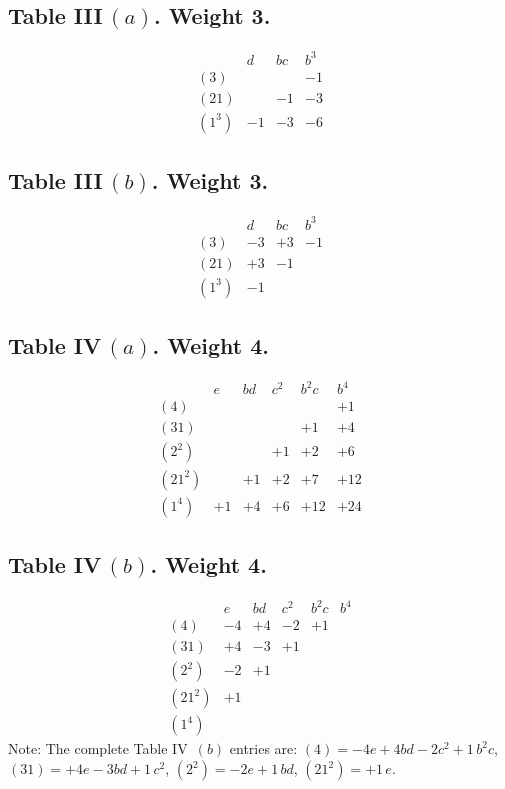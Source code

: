 \documentclass[11pt,a4paper]{book}
\begin{document}
\begin{center}
\subsection*{Table III\,$(a)$. Weight 3.}
\[
\begin{array}{c|ccc}
& d & bc & b^3 \\ \hline
(3) & & & -1 \\
(21) & & -1 & -3 \\
(1^3) & -1 & -3 & -6
\end{array}
\]

\subsection*{Table III\,$(b)$. Weight 3.}
\[
\begin{array}{c|ccc}
& d & bc & b^3 \\ \hline
(3) & -3 & +3 & -1 \\
(21) & +3 & -1 & \\
(1^3) & -1 & &
\end{array}
\]

\newpage
\subsection*{Table IV\,$(a)$. Weight 4.}
\[
\begin{array}{c|ccccc}
& e & bd & c^2 & b^2 c & b^4 \\ \hline
(4) & & & & & +1 \\
(31) & & & & +1 & +4 \\
(2^2) & & & +1 & +2 & +6 \\
(21^2) & & +1 & +2 & +7 & +12 \\
(1^4) & +1 & +4 & +6 & +12 & +24
\end{array}
\]

\subsection*{Table IV\,$(b)$. Weight 4.}
\[
\begin{array}{c|ccccc}
& e & bd & c^2 & b^2 c & b^4 \\ \hline
(4) & -4 & +4 & -2 & +1 \\
(31) & +4 & -3 & +1 \\
(2^2) & -2 & +1 \\
(21^2) & +1 \\
(1^4)
\end{array}
\]
Note: The complete Table IV~$(b)$ entries are:
$(4) = -4e + 4bd - 2c^2 + 1\,b^2 c$, $(31) = +4e - 3bd + 1\,c^2$,
$(2^2) = -2e + 1\,bd$, $(21^2) = +1\,e$.


\end{center}
\end{document}
